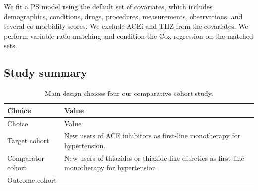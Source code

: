 \documentclass[]{book}
\begin{document}
We fit a PS model using the default set of covariates, which includes
demographics, conditions, drugs, procedures, measurements, observations,
and several co-morbidity scores. We exclude ACEi and THZ from the
covariates. We perform variable-ratio matching \citep{rassen_2012} and
condition the Cox regression on the matched sets.

\subsection{Study summary}\label{study-summary}

\begin{longtable}[]{@{}ll@{}}
\caption{\label{tab:aceChoices} Main design choices four our comparative
cohort study.}\tabularnewline
\toprule
\begin{minipage}[b]{0.23\columnwidth}\raggedright\strut
Choice\strut
\end{minipage} & \begin{minipage}[b]{0.71\columnwidth}\raggedright\strut
Value\strut
\end{minipage}\tabularnewline
\midrule
\endfirsthead
\toprule
\begin{minipage}[b]{0.23\columnwidth}\raggedright\strut
Choice\strut
\end{minipage} & \begin{minipage}[b]{0.71\columnwidth}\raggedright\strut
Value\strut
\end{minipage}\tabularnewline
\midrule
\endhead
\begin{minipage}[t]{0.23\columnwidth}\raggedright\strut
Target cohort\strut
\end{minipage} & \begin{minipage}[t]{0.71\columnwidth}\raggedright\strut
New users of ACE inhibitors as first-line monotherapy for
hypertension.\strut
\end{minipage}\tabularnewline
\begin{minipage}[t]{0.23\columnwidth}\raggedright\strut
Comparator cohort\strut
\end{minipage} & \begin{minipage}[t]{0.71\columnwidth}\raggedright\strut
New users of thiazides or thiazide-like diuretics as first-line
monotherapy for hypertension.\strut
\end{minipage}\tabularnewline
\begin{minipage}[t]{0.23\columnwidth}\raggedright\strut
Outcome cohort\strut
\end{minipage} & \begin{minipage}[t]{0.71\columnwidth}\raggedright\strut

\end{minipage}
\end{longtable}
\end{document}
